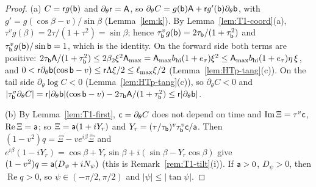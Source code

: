 \begin{proof}
(a) $C=\mathsf r g(\mathsf b)$ and $\partial_\theta\mathsf r=\mathsf A$, so $\partial_\theta C=g(\mathsf b)\mathsf A+\mathsf r g'(\mathsf b)\partial_\theta\mathsf b$, with
$g'=g(\cos\beta-v)/\sin\beta$ (Lemma~\ref{lem:k}). By Lemma~\ref{lem:T1-coord}(a), $\tau^vg(\beta)=2\tau/(1+\tau^2)=\sin\beta$; hence
$\tau_{\mathsf b}^vg(\mathsf b)=2\tau_{\mathsf b}/(1+\tau_{\mathsf b}^2)$ and $\tau_{\mathsf b}^vg(\mathsf b)/\sin\mathsf b=1$, which is the identity. On the forward side
both terms are positive: $2\tau_{\mathsf b}\mathsf A/(1+\tau_{\mathsf b}^2)\le2\beta_2\xi^2\mathsf A_{\max}=\mathsf A_{\max}b_{\mathrm{hi}}(1+e_\tau)\xi^2\le
\mathsf A_{\max}b_{\mathrm{hi}}(1+e_\tau)\eta\,\xi$, and $0<\mathsf r\partial_\theta\mathsf b(\cos\mathsf b-v)\le\mathsf r\Lambda\xi/2\le\ell_{\max}\xi/2$
(Lemma~\ref{lem:HTp-tang}(c)). On the tail side $\partial_\theta\log C<0$ (Lemma~\ref{lem:HTp-tang}(c)), so $\partial_\theta C<0$ and
$|\tau_{\mathsf b}^v\partial_\theta C|=\mathsf r|\partial_\theta\mathsf b|(\cos\mathsf b-v)-2\tau_{\mathsf b}\mathsf A/(1+\tau_{\mathsf b}^2)\le\mathsf r|\partial_\theta\mathsf b|$.

(b) By Lemma~\ref{lem:T1-first}, $\mathsf c=\partial_\theta C$ does not depend on time and $\operatorname{Im}\Xi=\tau^v\mathsf c$,
$\operatorname{Re}\Xi=\mathsf a$; so $\Xi=\mathsf a(1+iY_r)$ and $Y_r=(\tau/\tau_{\mathsf b})^v\tau_{\mathsf b}^v\mathsf c/\mathsf a$. Then
$(1-v^2)q=\Xi-ve^{i\beta}\bar\Xi$ and $e^{i\beta}(1-iY_r)=\cos\beta+Y_r\sin\beta+i(\sin\beta-Y_r\cos\beta)$ give
$(1-v^2)q=\mathsf a(D_\psi+iN_\psi)$ (this is Remark~\ref{rem:T1-tilt}(i)). If $\mathsf a>0$, $D_\psi>0$, then $\operatorname{Re}q>0$, so
$\psi\in(-\pi/2,\pi/2)$ and $|\psi|\le|\tan\psi|$.
\end{proof}

